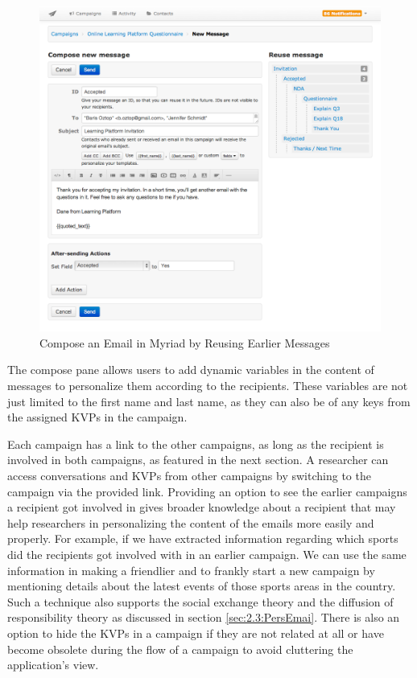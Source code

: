 \begin{figure}[htbp]
	\centering
	\includegraphics[width=1.00\textwidth]{imgs/ComposeEmail.png}
	\caption[Compose an Email in Myriad by Reusing Earlier Messages]{Compose an Email in Myriad by Reusing Earlier Messages}
	\label{fig:ComposeEmail}
\end{figure}

The compose pane allows users to add dynamic variables in the content of messages to personalize them according to the recipients. These variables are not just limited to the first name and last name, as they can also be of any keys from the assigned \ac{KVP}s in the campaign.
\vspace{1cm}

\clearpage

Each campaign has a link to the other campaigns, as long as the recipient is involved in both campaigns, as featured in the next section. A researcher can access conversations and \ac{KVP}s from other campaigns by switching to the campaign via the provided link. Providing an option to see the earlier campaigns a recipient got involved in gives broader knowledge about a recipient that may help researchers in personalizing the content of the emails more easily and properly. For example, if we have extracted information regarding which sports did the recipients got involved with in an earlier campaign. We can use the same information in making a friendlier and to frankly start a new campaign by mentioning details about the latest events of those sports areas in the country. Such a technique also supports the social exchange theory and the diffusion of responsibility theory as discussed in section \ref{sec:2.3:PersEmai}. There is also an option to hide the \ac{KVP}s in a campaign if they are not related at all or have become obsolete during the flow of a campaign to avoid cluttering the application's view.
\vspace{1cm}

